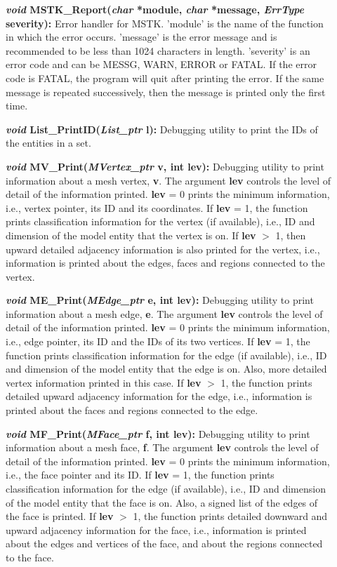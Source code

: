 \documentclass[12pt]{article}
\begin{document}
\begin{description}
  
\item[]{\bf {\em void} MSTK\_Report({\em char} *module,
  {\em char} *message, {\em ErrType} severity):} Error handler
  for MSTK. 'module' is the name of the function in which the error
  occurs. 'message' is the error message and is recommended to be less
  than 1024 characters in length. 'severity' is an error code and can
  be MESSG, WARN, ERROR or FATAL. If the error code is FATAL, the
  program will quit after printing the error. If the same message is
  repeated successively, then the message is printed only the first
  time.

\item[]{\bf {\em void} List\_PrintID({\em List\_ptr} l):} Debugging
utility to print the IDs of the entities in a set.

\item[]{\bf {\em void} MV\_Print({\em MVertex\_ptr} v, int
    lev):} Debugging utility to print information about a mesh vertex,
  {\bf v}. The argument {\bf lev} controls the level of detail
  of the information printed. {\bf lev} = 0 prints the minimum
  information, i.e., vertex pointer, its ID and its coordinates. If
  {\bf lev} = 1, the function prints classification information for
  the vertex (if available), i.e., ID and dimension of the model
  entity that the vertex is on. If {\bf lev} $>$ 1, then upward
  detailed adjacency information is also printed for the vertex, i.e.,
  information is printed about the edges, faces and regions connected
  to the vertex.
  
\item[]{\bf {\em void} ME\_Print({\em MEdge\_ptr} e, int
    lev):} Debugging utility to print information about a mesh edge,
  {\bf e}. The argument {\bf lev} controls the level of detail
  of the information printed. {\bf lev} = 0 prints the minimum
  information, i.e., edge pointer, its ID and the IDs of its two
  vertices. If {\bf lev} = 1, the function prints classification
  information for the edge (if available), i.e., ID and dimension of
  the model entity that the edge is on. Also, more detailed vertex
  information printed in this case. If {\bf lev} $>$ 1, the
  function prints detailed upward adjacency information for the edge,
  i.e., information is printed about the faces and regions connected
  to the edge.
    
  \item[]{\bf {\em void} MF\_Print({\em MFace\_ptr} f, int
      lev):} Debugging utility to print information about a mesh face,
    {\bf f}. The argument {\bf lev} controls the level of detail
    of the information printed. {\bf lev} = 0 prints the minimum
    information, i.e., the face pointer and its ID. If {\bf lev} =
    1, the function prints classification information for the edge (if
    available), i.e., ID and dimension of the model entity that the
    face is on. Also, a signed list of the edges of the face is
    printed.  If {\bf lev} $>$ 1, the function prints detailed
    downward and upward adjacency information for the face, i.e.,
    information is printed about the edges and vertices of the face,
    and about the regions connected to the face.
    

\end{description}
\end{document}
